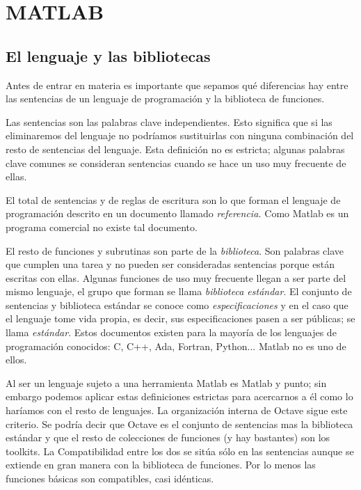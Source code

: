 
\chapter{MATLAB}



\section{El lenguaje y las bibliotecas}

Antes de entrar en materia es importante que sepamos qué diferencias
hay entre las sentencias de un lenguaje de programación y la
biblioteca de funciones.

Las sentencias son las palabras clave independientes. Esto significa
que si las eliminaremos del lenguaje no podríamos sustituirlas con
ninguna combinación del resto de sentencias del lenguaje. Esta
definición no es estricta; algunas palabras clave comunes se
consideran sentencias cuando se hace un uso muy frecuente de ellas.

El total de sentencias y de reglas de escritura son lo que forman el
lenguaje de programación descrito en un documento llamado
\emph{referencia.}  Como Matlab es un programa
comercial no existe tal documento.

El resto de funciones y subrutinas son parte de la
\emph{biblioteca}.  Son palabras clave que cumplen
una tarea y no pueden ser consideradas sentencias porque están
escritas con ellas. Algunas funciones de uso muy frecuente llegan a
ser parte del mismo lenguaje, el grupo que forman se llama
\emph{biblioteca estándar}.  El conjunto de
sentencias y biblioteca estándar se conoce como
\emph{especificaciones} y en el caso que el lenguaje tome vida propia,
es decir, sus especificaciones pasen a ser públicas; se llama
\emph{estándar}. Estos documentos existen para la mayoría de los
lenguajes de programación conocidos: C, C++, Ada, Fortran, Python...
Matlab no es uno de ellos.

Al ser un lenguaje sujeto a una herramienta Matlab es Matlab y punto;
sin embargo podemos aplicar estas definiciones estrictas para
acercarnos a él como lo haríamos con el resto de lenguajes. La
organización interna de Octave sigue este criterio. Se podría decir
que Octave es el conjunto de sentencias mas la biblioteca estándar y
que el resto de colecciones de funciones (y hay bastantes) son los
toolkits. La Compatibilidad entre los dos se sitúa sólo en las
sentencias aunque se extiende en gran manera con la biblioteca de
funciones. Por lo menos las funciones básicas son compatibles, casi
idénticas.

